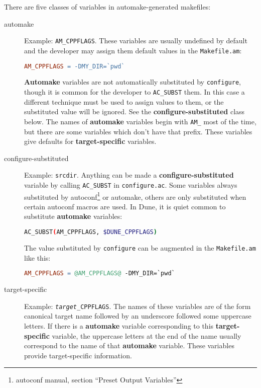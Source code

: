 \documentclass[11pt,a4paper,headinclude,footinclude,DIV16,normalheadings]{scrartcl}
\begin{document}
There are five classes of variables in automake-generated makefiles:
\begin{description}
\item[automake] Example: \texttt{AM\_CPPFLAGS}.  These variables are usually
  undefined by default and the developer may assign them default values in the
  \texttt{Makefile.am}:
  \begin{lstlisting}[language=make]
AM_CPPFLAGS = -DMY_DIR=`pwd`
  \end{lstlisting}
  {\bf Automake} variables are not automatically substituted by
  \texttt{configure}, though it is common for the developer to
  \lstinline[language=make]{AC_SUBST} them.  In this case a different
  technique must be  used to assign values to them, or the substituted value
  will be ignored.  See the {\bf configure-substituted} class below.  The
  names of {\bf automake} variables begin with \texttt{AM\_} most of the time,
  but there are some variables which don't have that prefix.  These variables
  give defaults for {\bf target-specific} variables.
\item[configure-substituted] Example: \lstinline[language=make]{srcdir}.
  Anything can be made a {\bf configure-substituted} variable by calling
  \lstinline[language=sh]{AC_SUBST} in \texttt{configure.ac}.  Some
  variables always substituted by autoconf\footnote{autoconf manual, section
    ``Preset Output Variables''} or automake, others are only substituted when
  certain autoconf macros are used.  In Dune, it is quiet common to substitute
  {\bf automake} variables:
  \begin{lstlisting}[language=sh]
AC_SUBST(AM_CPPFLAGS, $DUNE_CPPFLAGS)
  \end{lstlisting}
  The value substituted by \texttt{configure} can be augmented in the
  \texttt{Makefile.am} like this:
  \begin{lstlisting}[language=make]
AM_CPPFLAGS = @AM_CPPFLAGS@ -DMY_DIR=`pwd`
  \end{lstlisting}
\item[target-specific] Example: \texttt{\textit{target}\_CPPFLAGS}.  The names
  of these variables are of the form canonical target name followed by an
  underscore followed some uppercase letters.  If there is a {\bf automake}
  variable corresponding to this {\bf target-specific} variable, the uppercase
  letters at the end of the name usually correspond to the name of that {\bf
    automake} variable.  These variables provide target-specific information.

\end{description}
\end{document}
